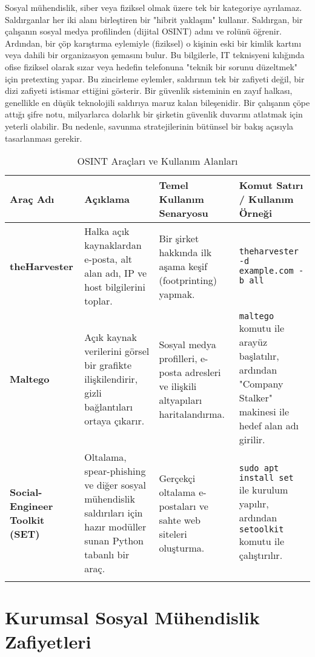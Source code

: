 Sosyal mühendislik, siber veya fiziksel olmak üzere tek bir kategoriye ayrılamaz. Saldırganlar her iki alanı birleştiren bir "hibrit yaklaşım" kullanır. Saldırgan, bir çalışanın sosyal medya profilinden (dijital OSINT) adını ve rolünü öğrenir. Ardından, bir çöp karıştırma eylemiyle (fiziksel) o kişinin eski bir kimlik kartını veya dahili bir organizasyon şemasını bulur. Bu bilgilerle, IT teknisyeni kılığında ofise fiziksel olarak sızar veya hedefin telefonuna "teknik bir sorunu düzeltmek" için pretexting yapar. Bu zincirleme eylemler, saldırının tek bir zafiyeti değil, bir dizi zafiyeti istismar ettiğini gösterir. Bir güvenlik sisteminin en zayıf halkası, genellikle en düşük teknolojili saldırıya maruz kalan bileşenidir. Bir çalışanın çöpe attığı şifre notu, milyarlarca dolarlık bir şirketin güvenlik duvarını atlatmak için yeterli olabilir. Bu nedenle, savunma stratejilerinin bütünsel bir bakış açısıyla tasarlanması gerekir.

\begin{longtable}{|p{4cm}|p{4cm}|p{4cm}|p{4cm}|}
    \hline
    \textbf{Araç Adı} & \textbf{Açıklama} & \textbf{Temel Kullanım Senaryosu} & \textbf{Komut Satırı / Kullanım Örneği} \\
    \hline
    \endhead
    \textbf{theHarvester} & Halka açık kaynaklardan e-posta, alt alan adı, IP ve host bilgilerini toplar. & Bir şirket hakkında ilk aşama keşif (footprinting) yapmak. & \verb|theharvester -d example.com -b all| \\
    \hline
    \textbf{Maltego} & Açık kaynak verilerini görsel bir grafikte ilişkilendirir, gizli bağlantıları ortaya çıkarır. & Sosyal medya profilleri, e-posta adresleri ve ilişkili altyapıları haritalandırma. & \verb|maltego| komutu ile arayüz başlatılır, ardından "Company Stalker" makinesi ile hedef alan adı girilir. \\
    \hline
    \textbf{Social-Engineer Toolkit (SET)} & Oltalama, spear-phishing ve diğer sosyal mühendislik saldırıları için hazır modüller sunan Python tabanlı bir araç. & Gerçekçi oltalama e-postaları ve sahte web siteleri oluşturma. & \verb|sudo apt install set| ile kurulum yapılır, ardından \verb|setoolkit| komutu ile çalıştırılır. \\
    \hline
\caption{OSINT Araçları ve Kullanım Alanları}
\end{longtable}

\section{Kurumsal Sosyal Mühendislik Zafiyetleri}


